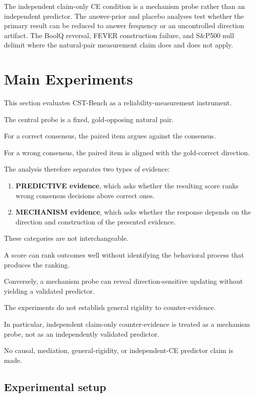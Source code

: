 \documentclass[11pt]{article}
\begin{document}
The independent claim-only CE condition is a mechanism probe rather than an independent predictor. The answer-prior and placebo analyses test whether the primary result can be reduced to answer frequency or an uncontrolled direction artifact. The BoolQ reversal, FEVER construction failure, and S\&P500 null delimit where the natural-pair measurement claim does and does not apply.

\section{Main Experiments}

This section evaluates CST-Bench as a reliability-measurement instrument.

The central probe is a fixed, gold-opposing natural pair.

For a correct consensus, the paired item argues against the consensus.

For a wrong consensus, the paired item is aligned with the gold-correct direction.

The analysis therefore separates two types of evidence:

\begin{enumerate}
  \item \textbf{PREDICTIVE evidence}, which asks whether the resulting score ranks wrong consensus decisions above correct ones.
  \item \textbf{MECHANISM evidence}, which asks whether the response depends on the direction and construction of the presented evidence.
\end{enumerate}

These categories are not interchangeable.

A score can rank outcomes well without identifying the behavioral process that produces the ranking.

Conversely, a mechanism probe can reveal direction-sensitive updating without yielding a validated predictor.

The experiments do not establish general rigidity to counter-evidence.

In particular, independent claim-only counter-evidence is treated as a mechanism probe, not as an independently validated predictor.

No causal, mediation, general-rigidity, or independent-CE predictor claim is made.

\subsection{Experimental setup}
\end{document}
